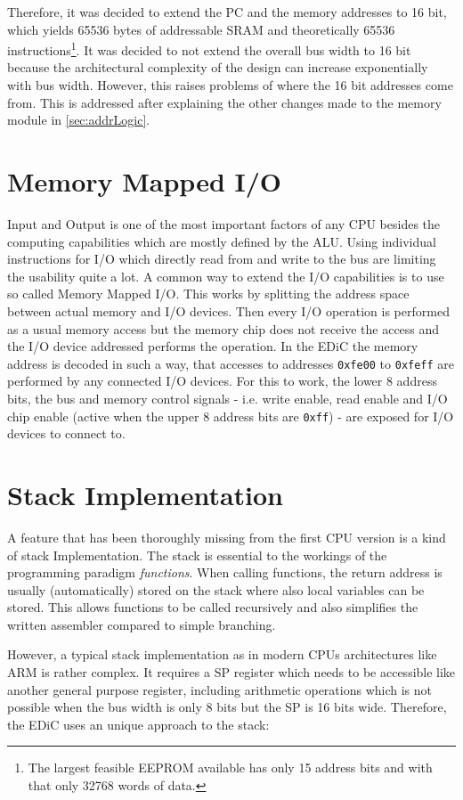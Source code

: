 Therefore, it was decided to extend the \gls{PC} and the memory addresses to 16 bit, which yields 65536 bytes of addressable \gls{SRAM} and theoretically 65536 instructions\footnote{The largest feasible \gls{EEPROM} available has only 15 address bits and with that only 32768 words of data.}.
It was decided to not extend the overall bus width to 16 bit because the architectural complexity of the design can increase exponentially with bus width.
However, this raises problems of where the 16 bit addresses come from.
This is addressed after explaining the other changes made to the memory module in \cref{sec:addrLogic}.

\section{Memory Mapped I/O}
Input and Output is one of the most important factors of any \gls{CPU} besides the computing capabilities which are mostly defined by the \gls{ALU}.
Using individual instructions for I/O which directly read from and write to the bus are limiting the usability quite a lot.
A common way to extend the I/O capabilities is to use so called Memory Mapped I/O.
This works by splitting the address space between actual memory and I/O devices.
Then every I/O operation is performed as a usual memory access but the memory chip does not receive the access and the I/O device addressed performs the operation.
In the \gls{EDiC} the memory address is decoded in such a way, that accesses to addresses \texttt{0xfe00} to \texttt{0xfeff} are performed by any connected I/O devices.
For this to work, the lower 8 address bits, the bus and memory control signals - i.e. write enable, read enable and I/O chip enable (active when the upper 8 address bits are \texttt{0xff}) - are exposed for I/O devices to connect to.
\section{Stack Implementation}
A feature that has been thoroughly missing from the first \gls{CPU} version is a kind of stack Implementation.
The stack is essential to the workings of the programming paradigm \emph{functions}.
When calling functions, the return address is usually (automatically) stored on the stack where also local variables can be stored.
This allows functions to be called recursively and also simplifies the written assembler compared to simple branching.

However, a typical stack implementation as in modern \glspl{CPU} architectures like ARM is rather complex.
It requires a \gls{SP} register which needs to be accessible like another general purpose register, including arithmetic operations which is not possible when the bus width is only 8 bits but the \gls{SP} is 16 bits wide.
Therefore, the \gls{EDiC} uses an unique approach to the stack:

